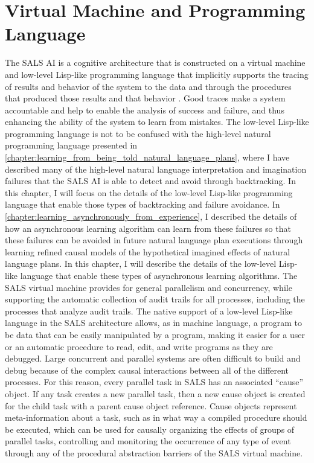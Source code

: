 \chapter{Virtual Machine and Programming Language}
\label{chapter:virtual_machine_and_programming_language}

The SALS AI is a cognitive architecture that is constructed on a
virtual machine and low-level Lisp-like programming language that
implicitly supports the tracing of results and behavior of the system
to the data and through the procedures that produced those results and
that behavior \cite[]{morgan:2009}.  Good traces make a system
accountable and help to enable the analysis of success and failure,
and thus enhancing the ability of the system to learn from mistakes.
The low-level Lisp-like programming language is not to be confused
with the high-level natural programming language presented in
{\mbox{\autoref{chapter:learning_from_being_told_natural_language_plans}}},
where I have described many of the high-level natural language
interpretation and imagination failures that the SALS AI is able to
detect and avoid through backtracking.  In this chapter, I will focus
on the details of the low-level Lisp-like programming language that
enable those types of backtracking and failure avoidance.  In
{\mbox{\autoref{chapter:learning_asynchronously_from_experience}}}, I
described the details of how an asynchronous learning algorithm can
learn from these failures so that these failures can be avoided in
future natural language plan executions through learning refined
causal models of the hypothetical imagined effects of natural language
plans.  In this chapter, I will describe the details of the low-level
Lisp-like language that enable these types of asynchronous learning
algorithms.  The SALS virtual machine provides for general parallelism
and concurrency, while supporting the automatic collection of audit
trails for all processes, including the processes that analyze audit
trails.  The native support of a low-level Lisp-like language in the
SALS architecture allows, as in machine language, a program to be data
that can be easily manipulated by a program, making it easier for a
user or an automatic procedure to read, edit, and write programs as
they are debugged.  Large concurrent and parallel systems are often
difficult to build and debug because of the complex causal
interactions between all of the different processes.  For this reason,
every parallel task in SALS has an associated ``cause'' object.  If
any task creates a new parallel task, then a new cause object is
created for the child task with a parent cause object reference.
Cause objects represent meta-information about a task, such as in what
way a compiled procedure should be executed, which can be used for
causally organizing the effects of groups of parallel tasks,
controlling and monitoring the occurrence of any type of event through
any of the procedural abstraction barriers of the SALS virtual
machine.

